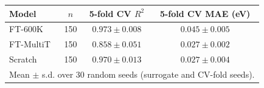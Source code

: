 \begin{tabular}{lccc}
\toprule
Model & $n$ & 5-fold CV $R^2$ & 5-fold CV MAE (eV) \\
\midrule
FT-600K & 150 & $0.973 \pm 0.008$ & $0.045 \pm 0.005$ \\
FT-MultiT & 150 & $0.858 \pm 0.051$ & $0.027 \pm 0.002$ \\
Scratch & 150 & $0.970 \pm 0.013$ & $0.027 \pm 0.004$ \\
\bottomrule
\multicolumn{4}{l}{\footnotesize Mean $\pm$ s.d. over 30 random seeds (surrogate and CV-fold seeds).}\\
\end{tabular}
